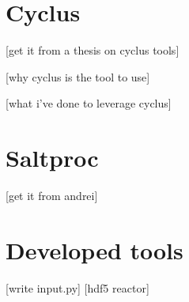 
\section{Cyclus}

[get it from a thesis on cyclus tools]

[why cyclus is the tool to use]

[what i've done to leverage cyclus]


\section{Saltproc}

[get it from andrei]

\section{Developed tools}

[write input.py]
[hdf5 reactor]
